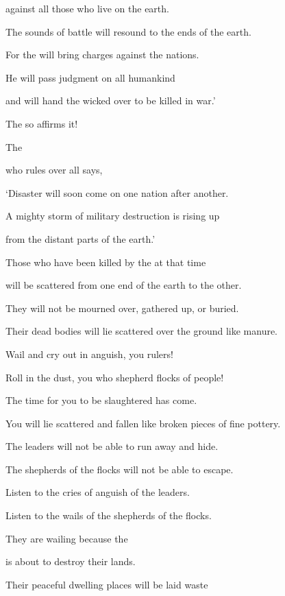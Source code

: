{\par }{\Q against all
those who live
on the earth.
\par }{\Q {}The sounds of battle
will resound
to
the ends
of the earth.
\par }{\Q For
the {}
will bring
charges against the nations.
\par }{\Q He will pass judgment
on all
humankind
\par }{\Q and will hand
the wicked
over
to be killed in war.’
\par }{\Q The
{}
so affirms it!
\par }{\Q {}The

{}
who rules over all
says,
\par }{\Q ‘Disaster
will soon come
on one nation
after another.
\par }{\Q A mighty storm
of military
destruction is rising up
\par }{\Q from the distant parts
of the earth.’
\par }{\Q {}Those who have been
killed
by the
{}
at that time
\par }{\Q will be scattered from one end
of the earth
to
the other.
\par }{\Q They will not
be mourned
over, gathered up,
or
buried.
\par }{\Q Their dead bodies will lie scattered over
the ground
like manure.
\par }{\Q {}Wail
and cry out
in anguish, you rulers!
\par }{\Q Roll
in the dust, you who shepherd
flocks
of people!

\par }{\Q The time
for
you to be slaughtered
has come.
\par }{\Q You will lie scattered
and fallen
like broken pieces of fine
pottery.
\par }{\Q {}The leaders
will not
be able to run away
and hide.

\par }{\Q The shepherds
of the flocks
will not be able to escape.
\par }{\Q {}Listen to the cries
of anguish
of the leaders.
\par }{\Q Listen to the wails
of the shepherds
of the flocks.
\par }{\Q They are wailing because
the {}
\par }{\Q is about to destroy
their lands.
\par }{\Q {}Their peaceful dwelling places
will be
laid
waste

}
